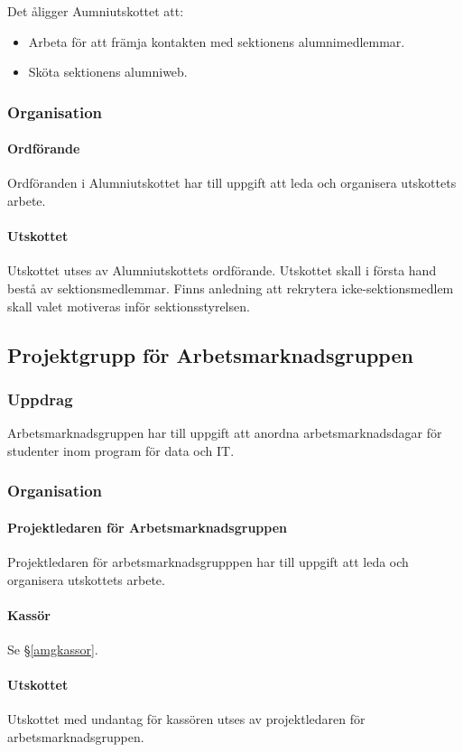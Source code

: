 \documentclass{datateknologsektionen-document}
\begin{document}
Det åligger Aumniutskottet att:
\begin{itemize}
  \item Arbeta för att främja kontakten med sektionens alumnimedlemmar.
  \item Sköta sektionens alumniweb.
\end{itemize}
\subsubsection{Organisation}
\paragraph{Ordförande}
Ordföranden i Alumniutskottet har till uppgift att leda och organisera utskottets arbete.
\paragraph{Utskottet}
Utskottet utses av Alumniutskottets ordförande. Utskottet skall i första hand bestå av
sektionsmedlemmar. Finns anledning att rekrytera icke-sektionsmedlem skall valet
motiveras inför sektionsstyrelsen.
\subsection{Projektgrupp för Arbetsmarknadsgruppen}
\label{amg}
\subsubsection{Uppdrag}
Arbetsmarknadsgruppen har till uppgift att anordna arbetsmarknadsdagar för studenter inom
program för data och IT.
\subsubsection{Organisation}
\paragraph{Projektledaren för Arbetsmarknadsgruppen}
Projektledaren för arbetsmarknadsgrupppen har till uppgift att leda och organisera
utskottets arbete.
\paragraph{Kassör}
Se \S \ref{amgkassor}.
\paragraph{Utskottet}
Utskottet med undantag för kassören utses av projektledaren för arbetsmarknadsgruppen.
\end{document}

